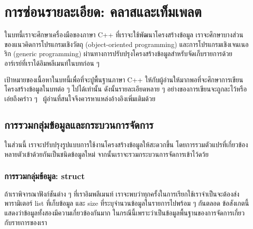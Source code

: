 \chapter{การ{\wbr}ซ่อน{\wbr}รายละเอียด: ค{\wbr}ลา{\wbr}ส{\wbr}และ{\wbr}เท็ม{\wbr}เพล{\wbr}ต}

ใน{\wbr}บท{\wbr}นี้{\wbr}เรา{\wbr}จะ{\wbr}ศึกษา{\wbr}เครื่องมือ{\wbr}ของ{\wbr}ภาษา C++ ที่{\wbr}เรา{\wbr}จะ{\wbr}ใช้{\wbr}พัฒนา{\wbr}โครงสร้าง{\wbr}ข้อมูล{\wbr}
เรา{\wbr}จะ{\wbr}ศึกษา{\wbr}บาง{\wbr}ส่วน{\wbr}ของ{\wbr}แนว{\wbr}คิด{\wbr}การ{\wbr}โปรแกรม{\wbr}เชิง{\wbr}วัตถุ (object-oriented programming)
และ{\wbr}การ{\wbr}โปรแกรม{\wbr}เชิง{\wbr}เจน{\wbr}เน{\wbr}อริ{\wbr}ก (generic programming)
ผ่าน{\wbr}ทางการ{\wbr}ปรับปรุง{\wbr}โครงสร้าง{\wbr}ข้อมูล{\wbr}สำหรับ{\wbr}จัด{\wbr}เก็บ{\wbr}รายการ{\wbr}ด้วย{\wbr}อาร์เรย์{\wbr}ที่{\wbr}เรา{\wbr}ได้{\wbr}อิม{\wbr}พลี{\wbr}เมนท์{\wbr}ใน{\wbr}บท{\wbr}ก่อน ๆ

เป้าหมาย{\wbr}ของ{\wbr}เนื้อหา{\wbr}ใน{\wbr}บท{\wbr}นี้{\wbr}เพื่อที่จะ{\wbr}ปู{\wbr}พื้นฐาน{\wbr}ภาษา C++
ให้{\wbr}กับ{\wbr}ผู้อ่าน{\wbr}ให้{\wbr}มาก{\wbr}พอ{\wbr}ที่{\wbr}จะ{\wbr}ศึกษา{\wbr}การ{\wbr}เขียน{\wbr}โครงสร้าง{\wbr}ข้อมูล{\wbr}ใน{\wbr}บท{\wbr}ต่อ ๆ ไป{\wbr}ได้{\wbr}เท่านั้น{\wbr}
ดังนั้น{\wbr}รายละเอียด{\wbr}หลาย ๆ อย่าง{\wbr}ของ{\wbr}การ{\wbr}เขียน{\wbr}จะ{\wbr}ถูก{\wbr}ละ{\wbr}ไว้{\wbr}หรือ{\wbr}เอ่ยถึง{\wbr}คร่าว ๆ
\ ผู้อ่าน{\wbr}ที่{\wbr}สนใจ{\wbr}จึง{\wbr}ควร{\wbr}หา{\wbr}แหล่ง{\wbr}อ้างอิง{\wbr}เพิ่มเติม{\wbr}ด้วย{\wbr}

\section{การ{\wbr}รวม{\wbr}กลุ่ม{\wbr}ข้อมูล{\wbr}และ{\wbr}กระบวนการ{\wbr}จัดการ}

ใน{\wbr}ส่วน{\wbr}นี้ เรา{\wbr}จะ{\wbr}ปรับปรุง{\wbr}รูปแบบ{\wbr}การ{\wbr}ใช้{\wbr}งาน{\wbr}โครงสร้าง{\wbr}ข้อมูล{\wbr}ให้{\wbr}สะดวก{\wbr}ขึ้น{\wbr}
โดย{\wbr}การ{\wbr}รวม{\wbr}ตัวแปร{\wbr}ที่{\wbr}เกี่ยวข้อง{\wbr}หลาย{\wbr}ตัว{\wbr}เข้า{\wbr}ด้วย{\wbr}กัน{\wbr}เป็น{\wbr}ชนิด{\wbr}ข้อมูล{\wbr}ใหม่{\wbr}
จากนั้น{\wbr}เรา{\wbr}จะ{\wbr}รวม{\wbr}กระบวนการ{\wbr}จัดการ{\wbr}เข้า{\wbr}ไว้{\wbr}ดว้ย

\subsection{การ{\wbr}รวม{\wbr}กลุ่ม{\wbr}ข้อมูล: {\ct struct}}

ถ้า{\wbr}เรา{\wbr}พิจารณา{\wbr}ฟังก์ชัน{\wbr}ต่าง ๆ ที่{\wbr}เรา{\wbr}อิม{\wbr}พลี{\wbr}เมนท์
เรา{\wbr}จะ{\wbr}พบ{\wbr}ว่า{\wbr}ทุก{\wbr}ครั้ง{\wbr}ใน{\wbr}การ{\wbr}เรียก{\wbr}ใช้{\wbr}เรา{\wbr}จำเป็น{\wbr}จะ{\wbr}ต้อง{\wbr}ส่ง{\wbr}พารามิเตอร์ {\ct list} ที่{\wbr}เก็บ{\wbr}ข้อมูล{\wbr}
และ {\ct size} ที่{\wbr}ระบุ{\wbr}จำนวน{\wbr}ข้อมูล{\wbr}ใน{\wbr}รายการ{\wbr}ไป{\wbr}พร้อม ๆ กัน{\wbr}ตลอด{\wbr}
ข้อสังเกต{\wbr}นี้{\wbr}แสดง{\wbr}ว่า{\wbr}ข้อมูล{\wbr}ทั้ง{\wbr}สอง{\wbr}มี{\wbr}ความ{\wbr}เกี่ยวข้อง{\wbr}กัน{\wbr}มาก{\wbr}
ใน{\wbr}กรณี{\wbr}นี้{\wbr}เพราะว่า{\wbr}เป็น{\wbr}ข้อมูล{\wbr}พื้นฐาน{\wbr}ของ{\wbr}การ{\wbr}จัดการ{\wbr}เกี่ยวกับ{\wbr}รายการ{\wbr}ของ{\wbr}เรา{\wbr}

